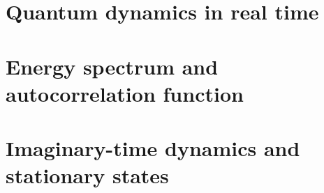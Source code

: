 \section*{Quantum dynamics in real time}

\lstset{style=mystyle}


\section*{Energy spectrum and autocorrelation function}

\lstset{style=mystyle}


\section*{Imaginary-time dynamics and stationary states}

\lstset{style=mystyle}
